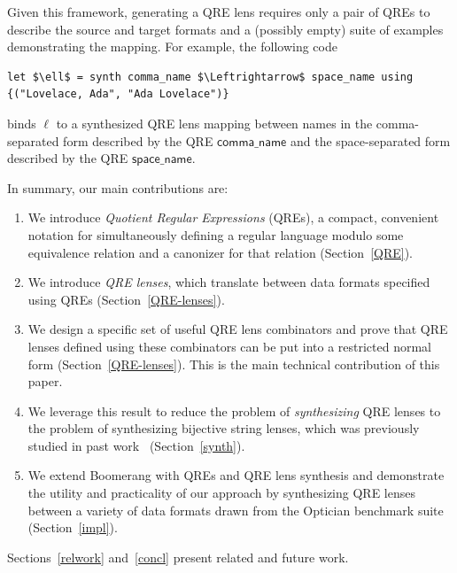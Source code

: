 \documentclass[acmsmall,review,anonymous]{acmart}
\newcommand{\codefont}[1]{\ensuremath{\mathsf{#1}}}
\begin{document}
Given this framework, generating a QRE lens requires only a pair of QREs to
describe the source and target formats and a (possibly empty) suite of examples
demonstrating the mapping.  For example, the following code

\begin{lstlisting}
let $\ell$ = synth comma_name $\Leftrightarrow$ space_name using {("Lovelace, Ada", "Ada Lovelace")}
\end{lstlisting}
binds $\ell$ to a synthesized QRE lens mapping between names in the
comma-separated form described by the QRE \codefont{comma\_name} and the
space-separated form described by the QRE \codefont{space\_name}. 

In summary, our main contributions are:
\begin{enumerate}
  \item We introduce {\em Quotient Regular Expressions} (QREs), 
  a compact, convenient notation for simultaneously defining a
  regular language modulo some equivalence relation and a canonizer
  for that relation (Section~\ref{QRE}).
  \item We introduce {\em QRE lenses}, which translate between data formats
  specified using QREs (Section~\ref{QRE-lenses}).
  \item We design a specific set of useful QRE lens combinators and prove
  that QRE lenses defined using these combinators can be put into a
  restricted normal form (Section~\ref{QRE-lenses}).  This is
  the main technical contribution of this paper.
  \item We leverage this result to reduce the problem of {\em synthesizing} QRE
  lenses to the problem of synthesizing bijective string lenses, which was
  previously studied in past work~\cite{optician} (Section~\ref{synth}).
  \item We extend Boomerang with QREs and QRE lens synthesis and demonstrate
  the utility and practicality of our approach by synthesizing QRE lenses
  between a variety of data formats drawn from the Optician benchmark suite
  (Section~\ref{impl}).
\end{enumerate}
Sections~\ref{relwork} and~\ref{concl} present related and future work.
\end{document}
